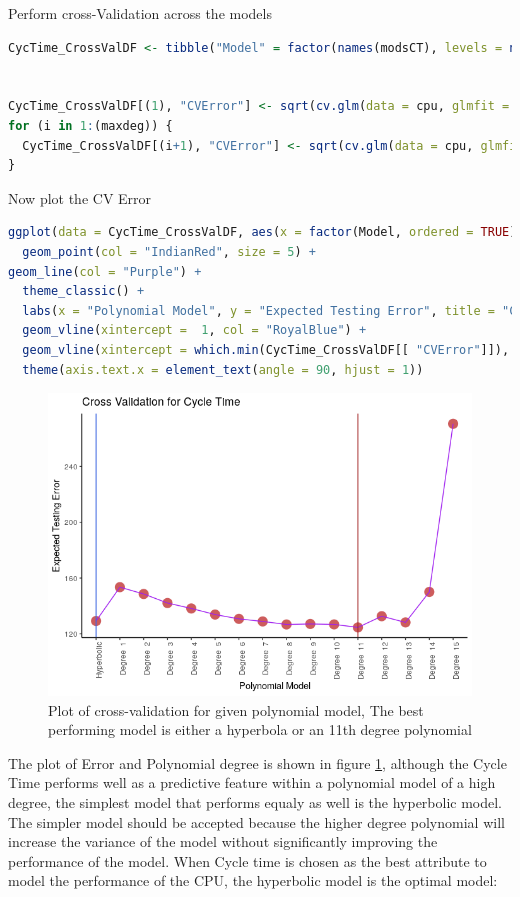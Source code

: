 \documentclass[
]{article}
\begin{document}
Perform cross-Validation across the models

\begin{lstlisting}[language=R]
CycTime_CrossValDF <- tibble("Model" = factor(names(modsCT), levels = names(modsCT), ordered = TRUE), "CVError" = rep(NA, maxdeg+1))


CycTime_CrossValDF[(1), "CVError"] <- sqrt(cv.glm(data = cpu, glmfit = modsCT[[1]], K = 10)$delta[1])
for (i in 1:(maxdeg)) {
  CycTime_CrossValDF[(i+1), "CVError"] <- sqrt(cv.glm(data = cpu, glmfit = modsCT[[(i+1)]], K = 10)$delta[1])
}
\end{lstlisting}

Now plot the CV Error

\begin{lstlisting}[language=R]
ggplot(data = CycTime_CrossValDF, aes(x = factor(Model, ordered = TRUE), y = CVError, group = 1)) +
  geom_point(col = "IndianRed", size = 5) +
geom_line(col = "Purple") +
  theme_classic() + 
  labs(x = "Polynomial Model", y = "Expected Testing Error", title = "Cross-Validation for Cycle Time") +
  geom_vline(xintercept =  1, col = "RoyalBlue") +
  geom_vline(xintercept = which.min(CycTime_CrossValDF[[ "CVError"]]), col = "brown") +
  theme(axis.text.x = element_text(angle = 90, hjust = 1))
\end{lstlisting}

\begin{figure}
	\centering
	\includegraphics[width=0.7\linewidth]{SecAssignment_files/figure-html/unnamed-chunk-24-1.png}
	\caption{Plot of cross-validation for given polynomial model, The best performing model is either a hyperbola or an 11th degree polynomial}
	\label{cvpoly}
\end{figure}


\newpage


The plot of Error and Polynomial degree is shown in figure \ref{cvpoly}, although the Cycle Time performs well as a predictive feature within a
polynomial model of a high degree, the simplest model that performs
equaly as well is the hyperbolic model. The simpler model should be
accepted because the higher degree polynomial will increase the
variance of the model without significantly improving the performance of
the model. When Cycle time is chosen as the best attribute to model the
performance of the CPU, the hyperbolic model is the optimal model:
\end{document}

